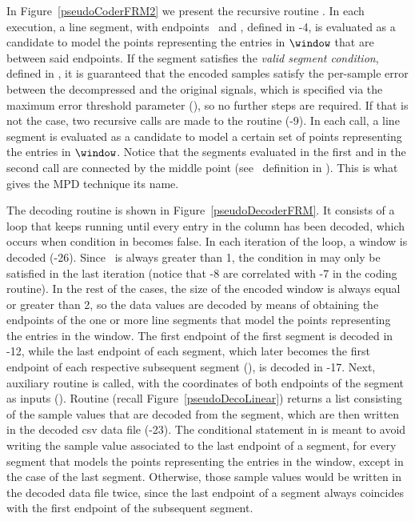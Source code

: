 


\vspace{-4pt}
In Figure~\ref{pseudoCoderFRM2} we present the recursive routine \getDisplacedPointsMethod. In each execution, a line segment, with endpoints \pointo\ and \pointf, defined in -4, is evaluated as a candidate to model the points representing the entries in $\window$ that are between said endpoints. If the segment satisfies the \textit{valid segment condition}, defined in , it is guaranteed that the encoded samples satisfy the per-sample error between the decompressed and the original signals, which is specified via the maximum error threshold parameter (\maxerror), so no further steps are required. If that is not the case, two recursive calls are made to the routine (-9). In each call, a line segment is evaluated as a candidate to model a certain set of points representing the entries in $\window$. Notice that the segments evaluated in the first and in the second call are connected by the middle point (see \half\ definition in ). This is what gives the MPD technique its name.





\clearpage


The decoding routine is shown in Figure~\ref{pseudoDecoderFRM}. It consists of a loop that keeps running until every entry in the column has been decoded, which occurs when condition in  becomes false. In each iteration of the loop, a window is decoded (-26). Since \win\ is always greater than 1, the condition in  may only be satisfied in the last iteration (notice that -8 are correlated with -7 in the coding routine). In the rest of the cases, the size of the encoded window is always equal or greater than 2, so the data values are decoded by means of obtaining the endpoints of the one or more line segments that model the points representing the entries in the window. The first endpoint of the first segment is decoded in -12, while the last endpoint of each segment, which later becomes the first endpoint of each respective subsequent segment (), is decoded in -17. Next, auxiliary routine \decodeSegment is called, with the coordinates of both endpoints of the segment as inputs (). Routine \decodeSegment (recall Figure~\ref{pseudoDecoLinear}) returns a list consisting of the sample values that are decoded from the segment, which are then written in the decoded csv data file (-23). The conditional statement in  is meant to avoid writing the sample value associated to the last endpoint of a segment, for every segment that models the points representing the entries in the window, except in the case of the last segment. Otherwise, those sample values would be written in the decoded data file twice, since the last endpoint of a segment always coincides with the first endpoint of the subsequent segment.



